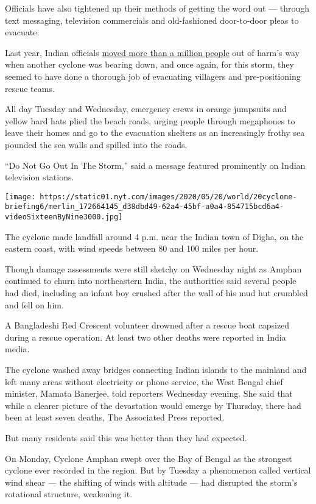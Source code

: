 Officials have also tightened up their methods of getting the word out
--- through text messaging, television commercials and old-fashioned
door-to-door pleas to evacuate.

Last year, Indian officials
\href{https://www.nytimes.com/2019/05/03/world/asia/cyclone-fani-india-evacuations.html}{moved
more than a million people} out of harm's way when another cyclone was
bearing down, and once again, for this storm, they seemed to have done a
thorough job of evacuating villagers and pre-positioning rescue teams.

All day Tuesday and Wednesday, emergency crews in orange jumpsuits and
yellow hard hats plied the beach roads, urging people through megaphones
to leave their homes and go to the evacuation shelters as an
increasingly frothy sea pounded the sea walls and spilled into the
roads.

``Do Not Go Out In The Storm,'' said a message featured prominently on
Indian television stations.

\texttt{[image: https://static01.nyt.com/images/2020/05/20/world/20cyclone-briefing6/merlin\_172664145\_d38dbd49-62a4-45bf-a0a4-854715bcd6a4-videoSixteenByNine3000.jpg]}

The cyclone made landfall around 4 p.m. near the Indian town of Digha,
on the eastern coast, with wind speeds between 80 and 100 miles per
hour.

Though damage assessments were still sketchy on Wednesday night as
Amphan continued to churn into northeastern India, the authorities said
several people had died, including an infant boy crushed after the wall
of his mud hut crumbled and fell on him.

A Bangladeshi Red Crescent volunteer drowned after a rescue boat
capsized during a rescue operation. At least two other deaths were
reported in India media.

The cyclone washed away bridges connecting Indian islands to the
mainland and left many areas without electricity or phone service, the
West Bengal chief minister, Mamata Banerjee, told reporters Wednesday
evening. She said that while a clearer picture of the devastation would
emerge by Thursday, there had been at least seven deaths, The Associated
Press reported.

But many residents said this was better than they had expected.

On Monday, Cyclone Amphan swept over the Bay of Bengal as the strongest
cyclone ever recorded in the region. But by Tuesday a phenomenon called
vertical wind shear --- the shifting of winds with altitude --- had
disrupted the storm's rotational structure, weakening it.

